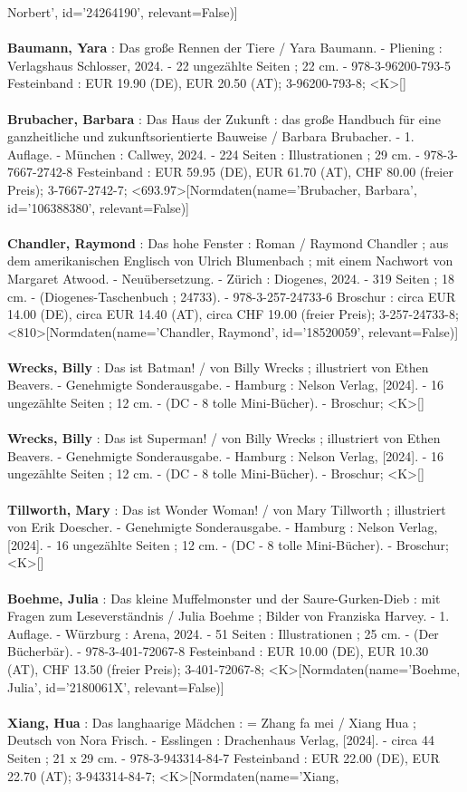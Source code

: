 \documentclass{article}
\begin{document}
\begin{multicols}{3}
Norbert', id='24264190', relevant=False)]\\\\\textbf{Baumann, Yara} : Das große Rennen der Tiere / Yara Baumann. - Pliening : Verlagshaus Schlosser, 2024. - 22 ungezählte Seiten ; 22 cm. - 978-3-96200-793-5 Festeinband : EUR 19.90 (DE), EUR 20.50 (AT); 3-96200-793-8; <K>[]\\\\\textbf{Brubacher, Barbara} : Das Haus der Zukunft : das große Handbuch für eine ganzheitliche und zukunftsorientierte Bauweise / Barbara Brubacher. - 1. Auflage. - München : Callwey, 2024. - 224 Seiten : Illustrationen ; 29 cm. - 978-3-7667-2742-8 Festeinband : EUR 59.95 (DE), EUR 61.70 (AT), CHF 80.00 (freier Preis); 3-7667-2742-7; <693.97>[Normdaten(name='Brubacher, Barbara', id='106388380', relevant=False)]\\\\\textbf{Chandler, Raymond} : Das hohe Fenster : Roman / Raymond Chandler ; aus dem amerikanischen Englisch von Ulrich Blumenbach ; mit einem Nachwort von Margaret Atwood. - Neuübersetzung. - Zürich : Diogenes, 2024. - 319 Seiten ; 18 cm. - (Diogenes-Taschenbuch ; 24733). - 978-3-257-24733-6 Broschur : circa EUR 14.00 (DE), circa EUR 14.40 (AT), circa CHF 19.00 (freier Preis); 3-257-24733-8; <810>[Normdaten(name='Chandler, Raymond', id='18520059', relevant=False)]\\\\\textbf{Wrecks, Billy} : Das ist Batman! / von Billy Wrecks ; illustriert von Ethen Beavers. - Genehmigte Sonderausgabe. - Hamburg : Nelson Verlag, [2024]. - 16 ungezählte Seiten ; 12 cm. - (DC - 8 tolle Mini-Bücher). - Broschur; <K>[]\\\\\textbf{Wrecks, Billy} : Das ist Superman! / von Billy Wrecks ; illustriert von Ethen Beavers. - Genehmigte Sonderausgabe. - Hamburg : Nelson Verlag, [2024]. - 16 ungezählte Seiten ; 12 cm. - (DC - 8 tolle Mini-Bücher). - Broschur; <K>[]\\\\\textbf{Tillworth, Mary} : Das ist Wonder Woman! / von Mary Tillworth ; illustriert von Erik Doescher. - Genehmigte Sonderausgabe. - Hamburg : Nelson Verlag, [2024]. - 16 ungezählte Seiten ; 12 cm. - (DC - 8 tolle Mini-Bücher). - Broschur; <K>[]\\\\\textbf{Boehme, Julia} : Das kleine Muffelmonster und der Saure-Gurken-Dieb : mit Fragen zum Leseverständnis / Julia Boehme ; Bilder von Franziska Harvey. - 1. Auflage. - Würzburg : Arena, 2024. - 51 Seiten : Illustrationen ; 25 cm. - (Der Bücherbär). - 978-3-401-72067-8 Festeinband : EUR 10.00 (DE), EUR 10.30 (AT), CHF 13.50 (freier Preis); 3-401-72067-8; <K>[Normdaten(name='Boehme, Julia', id='2180061X', relevant=False)]\\\\\textbf{Xiang, Hua} : Das langhaarige Mädchen : = Zhang fa mei / Xiang Hua ; Deutsch von Nora Frisch. - Esslingen : Drachenhaus Verlag, [2024]. - circa 44 Seiten ; 21 x 29 cm. - 978-3-943314-84-7 Festeinband : EUR 22.00 (DE), EUR 22.70 (AT); 3-943314-84-7; <K>[Normdaten(name='Xiang, 
\end{multicols}
\end{document}

